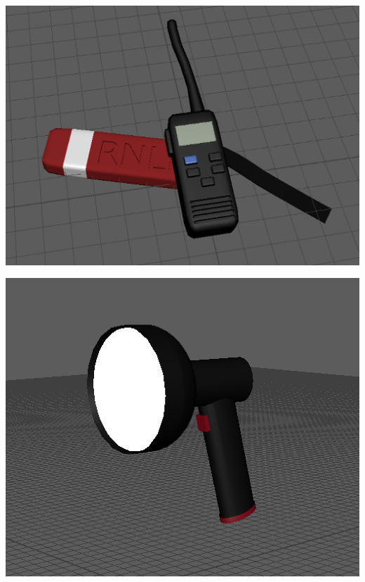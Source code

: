 \documentclass[a4paper, openright, twoside]{book}
\begin{document}
\begin{minipage}{\textwidth}
\begin{center}
\begin{minipage}{0.25\textwidth}
    \end{minipage}\hfill
    \begin{minipage}{0.25\textwidth}
        \centering
        \includegraphics[width=1\textwidth]{images/handheld.png}
    \end{minipage}\hfill
    \begin{minipage}{0.25\textwidth}
        \centering
        \includegraphics[width=1\textwidth]{images/light.png}
    \end{minipage}\hfill
\end{center}
\begin{center}
    \centering
    \begin{minipage}{0.25\textwidth}

\end{minipage}
\end{center}
\end{minipage}
\end{document}
